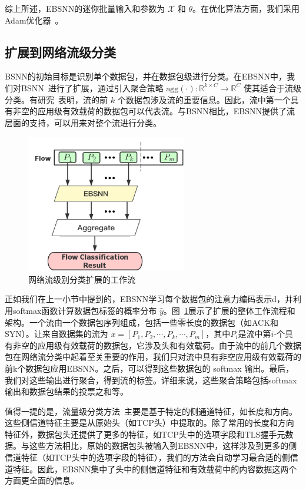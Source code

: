 \documentclass[degree=master,cjk-font=noto]{thuthesis}
\begin{document}
综上所述，EBSNN的迷你批量输入和参数为 $\mathcal{X}$ 和 $\theta$。在优化算法方面，我们采用Adam优化器~\cite{Adam}。

\subsection{扩展到网络流级分类}
\label{flow}

BSNN的初始目标是识别单个数据包，并在数据包级进行分类。在EBSNN中，我们对BSNN~\cite{bsnn}进行了扩展，通过引入聚合策略 $\text{agg}(\cdot): \mathbb{R}^{k \times C} \rightarrow \mathbb{R}^{C}$ 使其适合于流级分类。有研究~\cite{b12, MAAF}表明，流的前 $k$ 个数据包涉及流的重要信息。因此，流中第一个具有非空的应用级有效载荷的数据包可以代表流。与BSNN相比，EBSNN提供了流层面的支持，可以用来对整个流进行分类。

\begin{figure}[!tp]
	\centerline{\includegraphics[width=7cm]{BSNN_Extension_Flow.png}}
	\caption{网络流级别分类扩展的工作流}
	\label{fig_extension_flow}
\end{figure}

正如我们在上一小节中提到的，EBSNN学习每个数据包的注意力编码表示d，并利用softmax函数计算数据包标签的概率分布 $\hat{y}$。图~\ref{fig_extension_flow}展示了扩展的整体工作流程和架构。一个流由一个数据包序列组成，包括一些零长度的数据包（如ACK和SYN）。让来自数据集的流为 $x = [P_1, P_2, \cdots, P_k, \cdots, P_m]$，其中$P_i$是流中第$i$-个具有非空的应用级有效载荷的数据包，它涉及头和有效载荷。由于流中的前几个数据包在网络流分类中起着至关重要的作用，我们只对流中具有非空应用级有效载荷的前k个数据包应用EBSNN。之后，可以得到这些数据包的 softmax 输出。最后，我们对这些输出进行聚合，得到流的标签。详细来说，这些聚合策略包括softmax输出和数据包结果的投票之和等。

值得一提的是，流量级分类方法~\cite{b12, MAAF}主要是基于特定的侧通道特征，如长度和方向。这些侧信道特征主要是从原始头（如TCP头）中提取的。除了常用的长度和方向特征外，数据包头还提供了更多的特征，如TCP头中的选项字段和TLS握手元数据。与这些方法相比，原始的数据包头被输入到EBSNN中，这样涉及到更多的侧信道特征（如TCP头中的选项字段的特征），我们的方法会自动学习最合适的侧信道特征。因此，EBSNN集中了头中的侧信道特征和有效载荷中的内容数据这两个方面更全面的信息。
\end{document}
